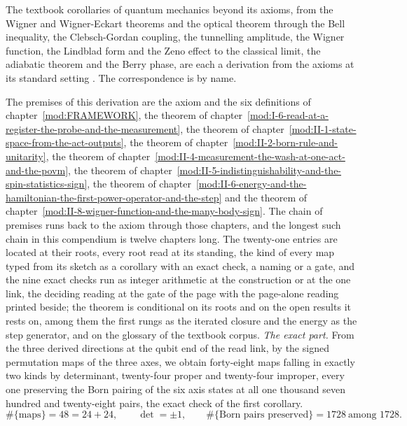 \begin{chbridge}
The textbook corollaries of quantum mechanics beyond its axioms, from the Wigner and Wigner-Eckart theorems and the optical theorem through the Bell inequality, the Clebsch-Gordan coupling, the tunnelling amplitude, the Wigner function, the Lindblad form and the Zeno effect to the classical limit, the adiabatic theorem and the Berry phase, are each a derivation from the axioms at its standard setting \cite{Sakurai1994,Nielsen2000}. The correspondence is by name.
\end{chbridge}
\begin{chproof}
The premises of this derivation are the axiom and the six definitions of chapter~\ref{mod:FRAMEWORK}, the theorem of chapter~\ref{mod:I-6-read-at-a-register-the-probe-and-the-measurement}, the theorem of chapter~\ref{mod:II-1-state-space-from-the-act-outputs}, the theorem of chapter~\ref{mod:II-2-born-rule-and-unitarity}, the theorem of chapter~\ref{mod:II-4-measurement-the-wash-at-one-act-and-the-povm}, the theorem of chapter~\ref{mod:II-5-indistinguishability-and-the-spin-statistics-sign}, the theorem of chapter~\ref{mod:II-6-energy-and-the-hamiltonian-the-first-power-operator-and-the-step} and the theorem of chapter~\ref{mod:II-8-wigner-function-and-the-many-body-sign}. The chain of premises runs back to the axiom through those chapters, and the longest such chain in this compendium is twelve chapters long.
The twenty-one entries are located at their roots, every root read at its standing, the kind of every map typed from its sketch as a corollary with an exact check, a naming or a gate, and the nine exact checks run as integer arithmetic at the construction or at the one link, the deciding reading at the gate of the page with the page-alone reading printed beside; the theorem is conditional on its roots and on the open results it rests on, among them the first rungs as the iterated closure and the energy as the step generator, and on the glossary of the textbook corpus.
\textit{The exact part.}
From the three derived directions at the qubit end of the read link, by the signed permutation maps of the three axes, we obtain forty-eight maps falling in exactly two kinds by determinant, twenty-four proper and twenty-four improper, every one preserving the Born pairing of the six axis states at all one thousand seven hundred and twenty-eight pairs, the exact check of the first corollary.
\begin{equation}
\#\{\text{maps}\} = 48 = 24 + 24, \qquad \det = \pm 1, \qquad \#\{\text{Born pairs preserved}\} = 1728 \ \text{among } 1728 .

\end{equation}
\end{chproof}
